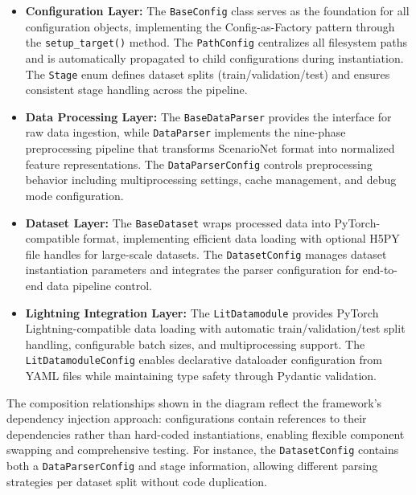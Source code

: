 \begin{itemize}[leftmargin=*]
    \item \textbf{Configuration Layer:} The \texttt{BaseConfig} class serves as the foundation for all configuration objects, implementing the Config-as-Factory pattern through the \texttt{setup\_target()} method. The \texttt{PathConfig} centralizes all filesystem paths and is automatically propagated to child configurations during instantiation. The \texttt{Stage} enum defines dataset splits (train/validation/test) and ensures consistent stage handling across the pipeline.
    \item \textbf{Data Processing Layer:} The \texttt{BaseDataParser} provides the interface for raw data ingestion, while \texttt{DataParser} implements the nine-phase preprocessing pipeline that transforms ScenarioNet format into normalized feature representations. The \texttt{DataParserConfig} controls preprocessing behavior including multiprocessing settings, cache management, and debug mode configuration.
    \item \textbf{Dataset Layer:} The \texttt{BaseDataset} wraps processed data into PyTorch-compatible format, implementing efficient data loading with optional H5PY file handles for large-scale datasets. The \texttt{DatasetConfig} manages dataset instantiation parameters and integrates the parser configuration for end-to-end data pipeline control.
    \item \textbf{Lightning Integration Layer:} The \texttt{LitDatamodule} provides PyTorch Lightning-compatible data loading with automatic train/validation/test split handling, configurable batch sizes, and multiprocessing support. The \texttt{LitDatamoduleConfig} enables declarative dataloader configuration from YAML files while maintaining type safety through Pydantic validation.
\end{itemize}

The composition relationships shown in the diagram reflect the framework's dependency injection approach: configurations contain references to their dependencies rather than hard-coded instantiations, enabling flexible component swapping and comprehensive testing. For instance, the \texttt{DatasetConfig} contains both a \texttt{DataParserConfig} and stage information, allowing different parsing strategies per dataset split without code duplication.

